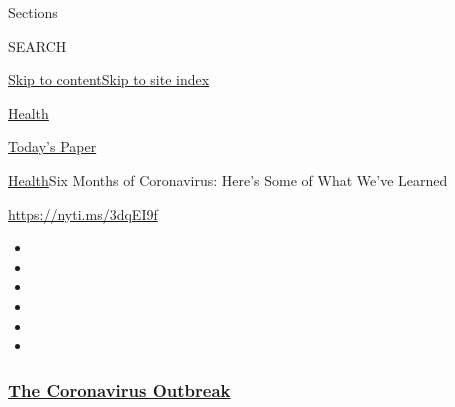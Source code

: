 Sections

SEARCH

\protect\hyperlink{site-content}{Skip to
content}\protect\hyperlink{site-index}{Skip to site index}

\href{https://www.nytimes3xbfgragh.onion/section/health}{Health}

\href{https://myaccount.nytimes3xbfgragh.onion/auth/login?response_type=cookie\&client_id=vi}{}

\href{https://www.nytimes3xbfgragh.onion/section/todayspaper}{Today's
Paper}

\href{/section/health}{Health}\textbar{}Six Months of Coronavirus:
Here's Some of What We've Learned

\url{https://nyti.ms/3dqEI9f}

\begin{itemize}
\item
\item
\item
\item
\item
\item
\end{itemize}

\hypertarget{the-coronavirus-outbreak}{%
\subsubsection{\texorpdfstring{\href{https://www.nytimes3xbfgragh.onion/news-event/coronavirus?name=styln-coronavirus-national\&region=TOP_BANNER\&block=storyline_menu_recirc\&action=click\&pgtype=Article\&impression_id=5a85b8d0-efba-11ea-a4c9-41c298b92ba2\&variant=undefined}{The
Coronavirus
Outbreak}}{The Coronavirus Outbreak}}\label{the-coronavirus-outbreak}}


